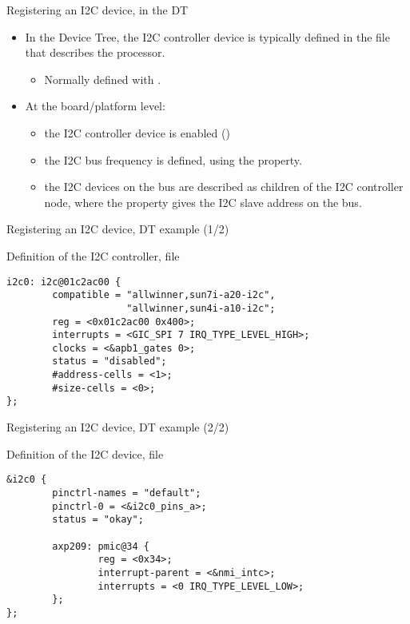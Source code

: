 \begin{frame}{Registering an I2C device, in the DT}
  \begin{itemize}
  \item In the Device Tree, the I2C controller device is typically
    defined in the  file that describes the processor.
    \begin{itemize}
    \item Normally defined with .
    \end{itemize}
  \item At the board/platform level:
    \begin{itemize}
    \item the I2C controller device is enabled
      ()
    \item the I2C bus frequency is defined, using the
       property.
    \item the I2C devices on the bus are described as children of the
      I2C controller node, where the  property gives the I2C
      slave address on the bus.
    \end{itemize}
  \end{itemize}
\end{frame}

\begin{frame}[fragile]{Registering an I2C device, DT example (1/2)}
  \begin{block}{Definition of the I2C controller,  file}
    \begin{verbatim}
i2c0: i2c@01c2ac00 {
        compatible = "allwinner,sun7i-a20-i2c",
                     "allwinner,sun4i-a10-i2c";
        reg = <0x01c2ac00 0x400>;
        interrupts = <GIC_SPI 7 IRQ_TYPE_LEVEL_HIGH>;
        clocks = <&apb1_gates 0>;
        status = "disabled";
        #address-cells = <1>;
        #size-cells = <0>;
};
    \end{verbatim}
  \end{block}
\end{frame}

\begin{frame}[fragile]{Registering an I2C device, DT example (2/2)}
  \begin{block}{Definition of the I2C device,  file}
    \begin{verbatim}
&i2c0 {
        pinctrl-names = "default";
        pinctrl-0 = <&i2c0_pins_a>;
        status = "okay";

        axp209: pmic@34 {
                reg = <0x34>;
                interrupt-parent = <&nmi_intc>;
                interrupts = <0 IRQ_TYPE_LEVEL_LOW>;
        };
};
    \end{verbatim}
  \end{block}
\end{frame}

